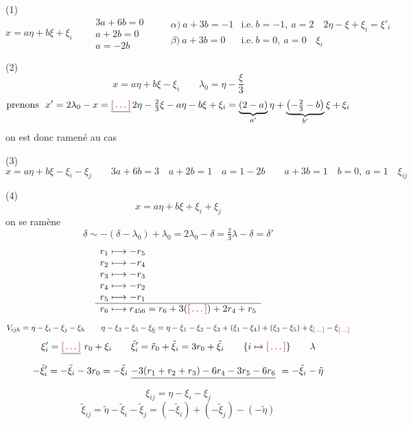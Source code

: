 \documentclass[11pt,a4paper]{article}
\begin{document}
(1) 
\[
  x=a\eta+b\xi+\xi_i \qquad
  \begin{array}{l}3a+6b=0\\ a+2b=0\\ a=-2b\end{array}
  \qquad
  \begin{array}{ll}
    \alpha)\ a+3b=-1 & \text{i.e.}\ \boxed{b=-1,\ a=2}\quad
      2\eta-\xi+\xi_i=\boxed{\xi'_i}\\
    \beta)\ a+3b=0 & \text{i.e.}\ b=0,\ a=0\quad \boxed{\xi_i}
  \end{array}
\]

(2)
\[
  x=a\eta+b\xi-\xi_i\qquad \lambda_0=\eta-\frac{\xi}{3}
\]
\[
  \text{prenons}\ \ x'=2\lambda_0-x=\struck{\ill{}}\,2\eta-\tfrac23\xi
  -a\eta-b\xi+\xi_i
  =\underbrace{(2-a)}_{a'}\eta
  +\underbrace{\bigl(-\tfrac23-b\bigr)}_{b'}\xi+\xi_i
\]
on est donc ramené au cas  \ill{}

(3)
\[
  x=a\eta+b\xi-\xi_i-\xi_j\qquad
  3a+6b=3\quad a+2b=1\quad a=1-2b\qquad
  a+3b=1\quad \boxed{b=0,\ a=1}\quad \boxed{\xi_{ij}}
\]

(4)
\[
  x=a\eta+b\xi+\xi_i+\xi_j
\]
on se ramène \ill{} \ill{} \ill{} 
\[
  \delta\sim-(\delta-\lambda_0)+\lambda_0=2\lambda_0-\delta
  =\tfrac23\lambda-\delta=\delta'
\]
\[
\begin{array}{l}
  r_1\longmapsto-r_5\\
  r_2\longmapsto-r_4\\
  r_3\longmapsto-r_3\\
  r_4\longmapsto-r_2\\
  r_5\longmapsto-r_1\\ \hline
  r_6\longmapsto r_{456}=r_6+3(\ill{})+2r_4+r_5
\end{array}
\]
\[
  V_{ijh}=\eta-\xi_i-\xi_j-\xi_h \qquad
  \eta-\xi_3-\xi_5-\xi_{\uncertain{6}}=\eta-\xi_1-\xi_2-\xi_3
  +(\xi_1-\xi_4)+(\xi_2-\xi_5)+\xi_{\ill{}}-\xi_{\ill{}}
\]
\[
  \xi'_i=\struck{\ill{}}\ r_0+\xi_i \qquad
  \tilde\xi'_i=\tilde r_0+\tilde\xi_i=3r_0+\tilde\xi_i
  \qquad \lbrace i\mapsto\ill{}\rbrace\qquad\lambda
\]
\[
  -\tilde\xi'_i=-\tilde\xi_i-3r_0=-\tilde\xi_i\
  \struck{-3(r_1+r_2+r_3)-6r_4-3r_5-6r_6}\ =-\tilde\xi_i-\tilde\eta
\]
\[
  \xi_{ij}=\eta-\xi_i-\xi_j
\]
\[
  \tilde\xi_{ij}=\tilde\eta-\tilde\xi_i-\tilde\xi_j
  =(-\tilde\xi_i)+(-\tilde\xi_j)-(-\tilde\eta)
\]
\end{document}
